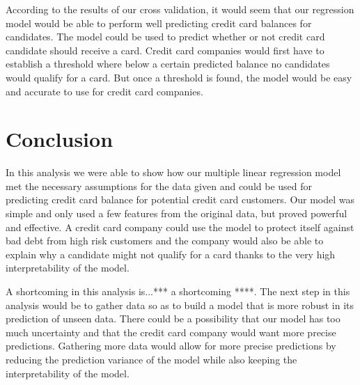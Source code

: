 \documentclass{article}
\begin{document}
According to the results of our cross validation, it would seem that our regression model would be able to perform well predicting credit card balances for candidates. The model could be used to predict whether or not credit card candidate should receive a card. Credit card companies would first have to establish a threshold where below a certain predicted balance no candidates would qualify for a card. But once a threshold is found, the model would be easy and accurate to use for credit card companies.

\section{Conclusion}
In this analysis we were able to show how our multiple linear regression model met the necessary assumptions for the data given and could be used for predicting credit card balance for potential credit card customers. Our model was simple and only used a few features from the original data, but proved powerful and effective. A credit card company could use the model to protect itself against bad debt from high risk customers and the company would also be able to explain why a candidate might not qualify for a card thanks to the very high interpretability of the model.

A shortcoming in this analysis is...*** a shortcoming ****. The next step in this analysis would be to gather data so as to build a model that is more robust in its prediction of unseen data. There could be a possibility that our model has too much uncertainty and that the credit card company would want more precise predictions. Gathering more data would allow for more precise predictions by reducing the prediction variance of the model while also keeping the interpretability of the model. 
\end{document}
